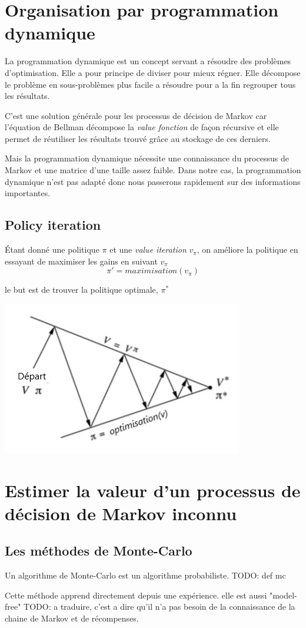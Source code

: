 \documentclass[a4paper,10pt]{article}
\begin{document}
\section{Organisation par programmation dynamique}
\par
La programmation dynamique est un concept servant a résoudre des problèmes d'optimisation. Elle a pour principe de diviser pour mieux régner. Elle décompose le problème en sous-problèmes plus facile a résoudre pour a la fin regrouper tous les résultats.
\par
C'est une solution générale pour les processus de décision de Markov car l'équation de Bellman décompose la  \textit{value fonction} de façon récursive et elle permet de réutiliser les résultats trouvé grâce au stockage de ces derniers.

Mais la programmation dynamique nécessite une connaissance du processus de Markov et une matrice d'une taille assez faible.
Dans notre cas, la programmation dynamique n'est pas adapté donc nous passerons rapidement sur des informations importantes.

\subsection{Policy iteration} 
\par
Étant donné une politique $\pi$ et une \textit{value iteration} $v_{\pi}$, on améliore la politique en essayant de maximiser les gains en suivant $v_{\pi}$
\[
\pi' = maximisation(v_{\pi})
\]

le but est de trouver la politique optimale, $\pi^*$

\includegraphics[scale=0.8]{image1.jpg}

\section{Estimer la valeur d'un processus de décision de Markov inconnu}

\subsection{Les méthodes de Monte-Carlo}
	
Un algorithme de Monte-Carlo est un algorithme probabiliste. TODO:  def mc

Cette méthode apprend directement depuis une expérience. elle est aussi "model-free" TODO: a traduire, c'est a dire qu'il n'a pas besoin de la connaissance de la chaine de Markov et de récompenses.
	
\end{document}
